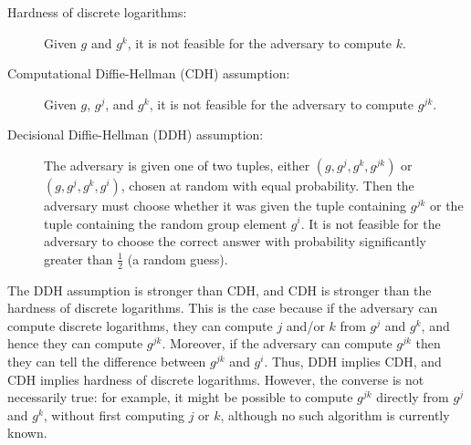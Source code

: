 \documentclass{article}
\begin{document}
\begin{description}
\item[Hardness of discrete logarithms:]
    Given $g$ and $g^k$, it is not feasible for the adversary to compute $k$.
\item[Computational Diffie-Hellman (CDH) assumption:]
    Given $g$, $g^j$, and $g^k$, it is not feasible for the adversary to compute $g^{jk}$.
\item[Decisional Diffie-Hellman (DDH) assumption:]
    The adversary is given one of two tuples, either $(g, g^j, g^k, g^{jk})$ or $(g, g^j, g^k, g^i)$, chosen at random with equal probability.
    Then the adversary must choose whether it was given the tuple containing $g^{jk}$ or the tuple containing the random group element $g^i$.
    It is not feasible for the adversary to choose the correct answer with probability significantly greater than $\frac{1}{2}$ (a random guess).
\end{description}

The DDH assumption is stronger than CDH, and CDH is stronger than the hardness of discrete logarithms.
This is the case because if the adversary can compute discrete logarithms, they can compute $j$ and/or $k$ from $g^j$ and $g^k$, and hence they can compute $g^{jk}$.
Moreover, if the adversary can compute $g^{jk}$ then they can tell the difference between $g^{jk}$ and $g^i$.
Thus, DDH implies CDH, and CDH implies hardness of discrete logarithms.
However, the converse is not necessarily true: for example, it might be possible to compute $g^{jk}$ directly from $g^j$ and $g^k$, without first computing $j$ or $k$, although no such algorithm is currently known.
\end{document}
